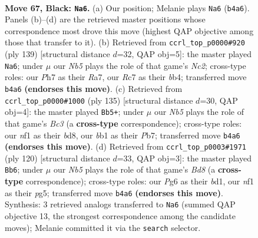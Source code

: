 \documentclass[11pt]{article}
\begin{document}
\clearpage

\begin{figure}[p]\centering
\begin{subfigure}{0.46\textwidth}\centering
\resizebox{\linewidth}{!}{%
\newchessgame
\chessboard[
  setfen={8/2r2p1p/6p1/4P3/bn3Pp1/8/7P/1B2kNK1 b - - 25 67},
  showmover=false,
  pgfstyle=straightmove, color=movearrow, markmove={b4-a6}
]}
\caption{}
\end{subfigure}\hfill
\begin{subfigure}{0.46\textwidth}\centering
\resizebox{\linewidth}{!}{%
\newchessgame
\chessboard[
  setfen={8/r1n4k/5pp1/7p/1BN4P/3K1BP1/8/8 b - - 7 70},
  showmover=false,
  pgfstyle=straightmove, color=movearrow, markmove={c7-a6}
]}
\caption{}
\end{subfigure}
\\[4pt]
\begin{subfigure}{0.46\textwidth}\centering
\resizebox{\linewidth}{!}{%
\newchessgame
\chessboard[
  setfen={3B4/1p6/p1b1kp2/P6p/3P4/3K2P1/7P/8 b - - 12 68},
  showmover=false,
  pgfstyle=straightmove, color=movearrow, markmove={c6-b5}
]}
\caption{}
\end{subfigure}\hfill
\begin{subfigure}{0.46\textwidth}\centering
\resizebox{\linewidth}{!}{%
\newchessgame
\chessboard[
  setfen={3B4/8/p5kp/3p2p1/6P1/P1P2P2/6K1/3b4 w - - 6 61},
  showmover=false,
  pgfstyle=straightmove, color=movearrow, markmove={d8-b6}
]}
\caption{}
\end{subfigure}
\caption{\textbf{Move 67, Black: \texttt{Na6}.} (a) Our position; Melanie plays \texttt{Na6} (\texttt{b4a6}). Panels (b)--(d) are the retrieved master positions whose correspondence most drove this move (highest QAP objective among those that transfer to it). (b) Retrieved from \texttt{ccrl\_top\_p0000\#920} (ply 139) [structural distance $d$=32, QAP obj=5]: the master played \texttt{Na6}; under $\mu$ our \emph{Nb5} plays the role of that game's \emph{Nc2}; cross-type roles: our \emph{P}h7 as their \emph{R}a7, our \emph{R}c7 as their \emph{b}b4; transferred move \texttt{b4a6} \textbf{(endorses this move)}. (c) Retrieved from \texttt{ccrl\_top\_p0000\#1000} (ply 135) [structural distance $d$=30, QAP obj=4]: the master played \texttt{Bb5+}; under $\mu$ our \emph{Nb5} plays the role of that game's \emph{Bc3} (a \textbf{cross-type} correspondence); cross-type roles: our \emph{n}f1 as their \emph{b}d8, our \emph{b}b1 as their \emph{P}b7; transferred move \texttt{b4a6} \textbf{(endorses this move)}. (d) Retrieved from \texttt{ccrl\_top\_p0003\#1971} (ply 120) [structural distance $d$=33, QAP obj=3]: the master played \texttt{Bb6}; under $\mu$ our \emph{Nb5} plays the role of that game's \emph{Bd8} (a \textbf{cross-type} correspondence); cross-type roles: our \emph{P}g6 as their \emph{b}d1, our \emph{n}f1 as their \emph{p}g5; transferred move \texttt{b4a6} \textbf{(endorses this move)}. Synthesis: 3 retrieved analogs transferred to \texttt{Na6} (summed QAP objective 13, the strongest correspondence among the candidate moves); Melanie committed it via the \texttt{search} selector.}
\label{fig:thought-m133}
\end{figure}
\end{document}
